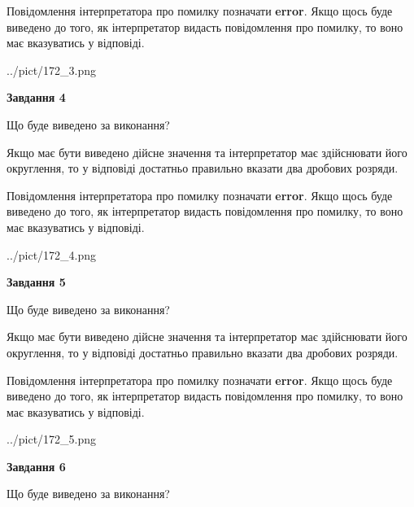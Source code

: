 \documentclass[12pt, ukrainian]{article}
\begin{document}
{\begin {Large}
Повідомлення інтерпретатора про помилку позначати \textbf{error}.
Якщо щось буде виведено до того, як інтерпретатор видасть повідомлення про помилку, 
то воно має вказуватись у відповіді. \par

\begin{center}
	{../pict/172_3.png}
\end{center}
\newpage

{\begin {center}\textbf{Завдання 4}\end {center}}\par
Що буде виведено за виконання? \par

Якщо має бути виведено дійсне значення та інтерпретатор має здійснювати його округлення, 
то у відповіді достатньо правильно вказати два дробових розряди.

Повідомлення інтерпретатора про помилку позначати \textbf{error}.
Якщо щось буде виведено до того, як інтерпретатор видасть повідомлення про помилку, 
то воно має вказуватись у відповіді. \par

\begin{center}
	{../pict/172_4.png}
\end{center}
\newpage

{\begin {center}\textbf{Завдання 5}\end {center}}\par
Що буде виведено за виконання? \par

Якщо має бути виведено дійсне значення та інтерпретатор має здійснювати його округлення, 
то у відповіді достатньо правильно вказати два дробових розряди.

Повідомлення інтерпретатора про помилку позначати \textbf{error}.
Якщо щось буде виведено до того, як інтерпретатор видасть повідомлення про помилку, 
то воно має вказуватись у відповіді. \par

\begin{center}
	{../pict/172_5.png}
\end{center}
\newpage

{\begin {center}\textbf{Завдання 6}\end {center}}\par
Що буде виведено за виконання? \par


\end{Large}}
\end{document}
